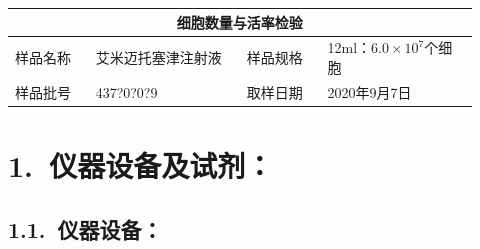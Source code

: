 \documentclass[UTF8,10pt,a4paper,fontset=fandol]{ctexart}
\newcommand{\fieldvalue}[1]{#1}
\newcommand{\handwritten}[1]{#1}
\begin{document}
\begin{center}
\begin{tabular}{|p{0.16\linewidth}|p{0.30\linewidth}|p{0.16\linewidth}|p{0.30\linewidth}|}
\hline
\multicolumn{4}{|c|}{细胞数量与活率检验}\\
\hline
样品名称 &
\fieldvalue{艾米迈托塞津注射液} &
样品规格 &
\fieldvalue{12ml：$6.0\times10^7$个细胞}\\
\hline
样品批号 &
\fieldvalue{\handwritten{437?0?0?9}} &
取样日期 &
\fieldvalue{\handwritten{2020年9月7日}}\\
\hline
\end{tabular}
\end{center}

\section*{1.\ 仪器设备及试剂：}

\subsection*{1.1.\ 仪器设备：}
\end{document}

